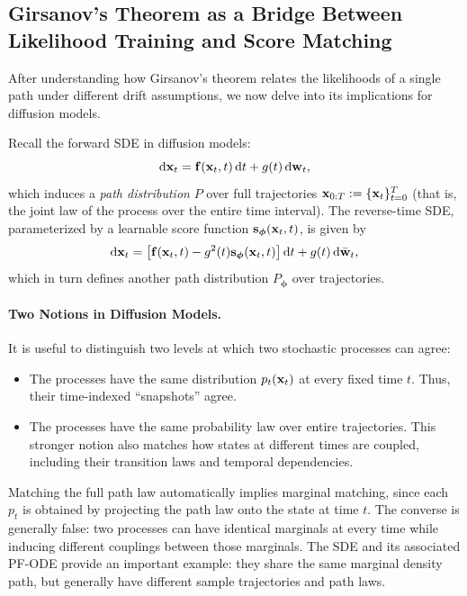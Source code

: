 \subsection{Girsanov’s Theorem as a Bridge Between Likelihood Training and Score Matching}\label{subsec:girsanov}

After understanding how Girsanov's theorem relates the likelihoods of a single
path under different drift assumptions, we now delve into its implications for
diffusion models.

Recall the forward SDE in diffusion models:
\[
\mathop{}\!\mathrm{d} {\mathbf{x}}_t = {\mathbf{f}}({\mathbf{x}}_t, t) \mathop{}\!\mathrm{d} t + g(t) \mathop{}\!\mathrm{d} {\mathbf{w}}_t,
\]
which induces a \emph{path distribution} $P$ over full trajectories
${\mathbf{x}}_{0:T} := \{{\mathbf{x}}_t\}_{t=0}^T$ (that is, the joint law of the process over
the entire time interval).
The reverse-time SDE, parameterized by a learnable score function
${\mathbf{s}}_{\bm{\phi}}({\mathbf{x}}_t, t)$, is given by
\[
\mathop{}\!\mathrm{d} {\mathbf{x}}_t = \big[{\mathbf{f}}({\mathbf{x}}_t, t) - g^2(t) {\mathbf{s}}_{\bm{\phi}}({\mathbf{x}}_t, t)\big] \mathop{}\!\mathrm{d} t
+ g(t) \mathop{}\!\mathrm{d} \bar{{\mathbf{w}}}_t,
\]
which in turn defines another path distribution
$P_{\bm{\phi}}$ over trajectories.


\paragraph{Two Notions in Diffusion Models.}
It is useful to distinguish two levels at which two stochastic processes can
agree:
\begin{itemize}
    \item {}
    The processes have the same distribution $p_t({\mathbf{x}}_t)$ at every fixed
    time $t$. Thus, their time-indexed ``snapshots'' agree.

    \item {}
    The processes have the same probability law over entire trajectories.
    This stronger notion also matches how states at different times are
    coupled, including their transition laws and temporal dependencies.
\end{itemize}

Matching the full path law automatically implies marginal matching, since
each $p_t$ is obtained by projecting the path law onto the state at time
$t$. The converse is generally false: two processes can have identical
marginals at every time while inducing different couplings between those
marginals. The SDE and its associated PF-ODE provide an important example:
they share the same marginal density path, but generally have different
sample trajectories and path laws.



